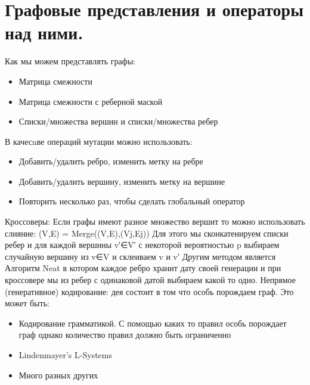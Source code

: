 \section{Графовые представления и операторы над ними.}
Как мы можем представлять графы:
\begin{itemize}
	\item Матрица смежности
	\item Матрица смежности с реберной маской
	\item Списки/множества вершин и списки/множества ребер
\end{itemize}
В качесnве операций мутации можно использовать:
\begin{itemize}
	\item Добавить/удалить ребро, изменить метку на ребре
	\item Добавить/удалить вершину, изменить метку на вершине
	\item Повторить несколько раз, чтобы сделать глобальный оператор
\end{itemize}
Кроссоверы:
Если графы имеют разное множество вершит то можно использовать слияние: (V,E) = Merge((V,E),(Vj,Ej))
Для этого мы сконкатенируем списки ребер и для каждой вершины v′∈V′ с некоторой вероятностью p выбираем случайную вершину из v∈V и склеиваем v и v′
Другим методом является Алгоритм Neat в котором каждое ребро хранит дату своей генерации и при кроссовере мы из ребер с одинаковой датой выбираем какой то одно. 
Непрямое (генеративное) кодирование:
дея состоит в том что особь порождаем граф. Это может быть:
\begin{itemize}
	\item Кодирование грамматикой. С помощью каких то правил особь порождает граф однако количество правил должно быть ограниченно 
	\item Lindenmayer’s L-Systems
	\item Много разных других
\end{itemize}
